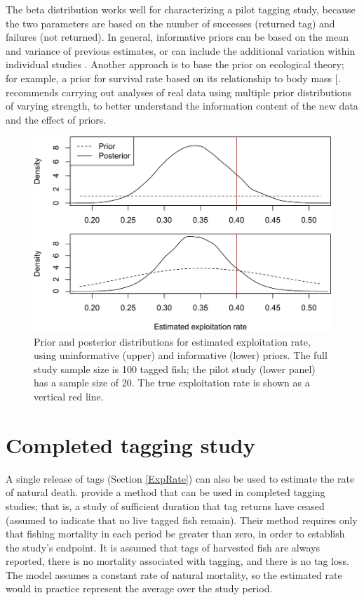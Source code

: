 \documentclass[
]{krantz}
\begin{document}
The beta distribution works well for characterizing a pilot tagging study, because the two parameters are based on the number of successes (returned tag) and failures (not returned). In general, informative priors can be based on the mean and variance of previous estimates, or can include the additional variation within individual studies \citep{mccarthy.masters_2005, regehr.etal_2018}. Another approach is to base the prior on ecological theory; for example, a prior for survival rate based on its relationship to body mass {[}\citep{mccarthy.masters_2005}. \citet{lemoine_2019} recommends carrying out analyses of real data using multiple prior distributions of varying strength, to better understand the information content of the new data and the effect of priors.

\begin{figure}
\includegraphics[width=0.9\linewidth]{bookdown_files/figure-latex/InfPriorPlot-1} \caption{Prior and posterior distributions for estimated exploitation rate, using uninformative (upper) and informative (lower) priors. The full study sample size is 100 tagged fish; the pilot study (lower panel) has a sample size of 20. The true exploitation rate is shown as a vertical red line.}\label{fig:InfPriorPlot}
\end{figure}

\hypertarget{Hearn}{%
\section{Completed tagging study}\label{Hearn}}

A single release of tags (Section \ref{ExpRate}) can also be used to estimate the rate of natural death. \citet{hearn.etal1987} provide a method that can be used in completed tagging studies; that is, a study of sufficient duration that tag returns have ceased (assumed to indicate that no live tagged fish remain). Their method requires only that fishing mortality in each period be greater than zero, in order to establish the study's endpoint. It is assumed that tags of harvested fish are always reported, there is no mortality associated with tagging, and there is no tag loss. The model assumes a constant rate of natural mortality, so the estimated rate would in practice represent the average over the study period.
\end{document}
